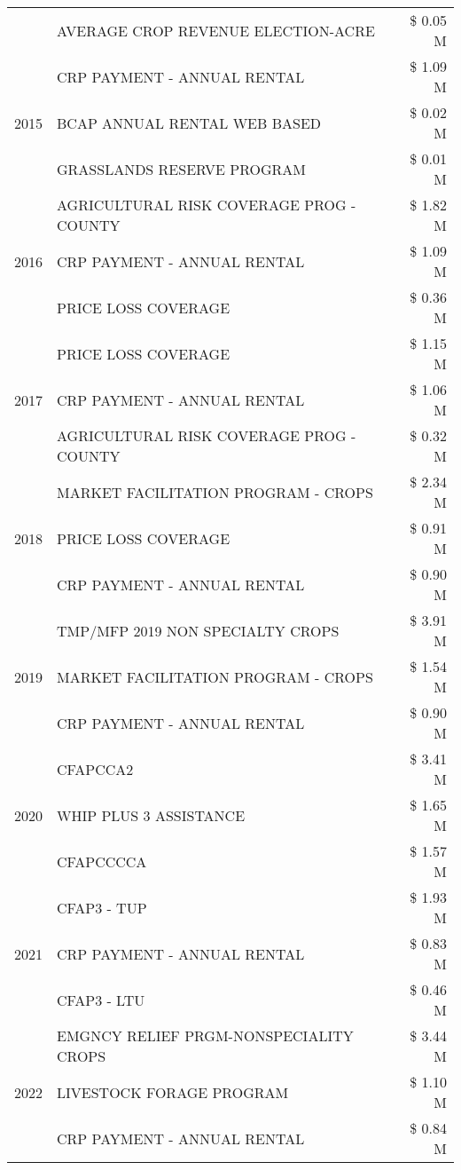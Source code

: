 \begin{tabular}{llr}
 & AVERAGE CROP REVENUE ELECTION-ACRE & \$ 0.05 M \\
\cline{1-3}
\multirow[t]{3}{*}{2015} & CRP PAYMENT - ANNUAL RENTAL & \$ 1.09 M \\
 & BCAP ANNUAL RENTAL WEB BASED & \$ 0.02 M \\
 & GRASSLANDS RESERVE PROGRAM & \$ 0.01 M \\
\cline{1-3}
\multirow[t]{3}{*}{2016} & AGRICULTURAL RISK COVERAGE PROG - COUNTY & \$ 1.82 M \\
 & CRP PAYMENT - ANNUAL RENTAL & \$ 1.09 M \\
 & PRICE LOSS COVERAGE & \$ 0.36 M \\
\cline{1-3}
\multirow[t]{3}{*}{2017} & PRICE LOSS COVERAGE & \$ 1.15 M \\
 & CRP PAYMENT - ANNUAL RENTAL & \$ 1.06 M \\
 & AGRICULTURAL RISK COVERAGE PROG - COUNTY & \$ 0.32 M \\
\cline{1-3}
\multirow[t]{3}{*}{2018} & MARKET FACILITATION PROGRAM - CROPS & \$ 2.34 M \\
 & PRICE LOSS COVERAGE & \$ 0.91 M \\
 & CRP PAYMENT - ANNUAL RENTAL & \$ 0.90 M \\
\cline{1-3}
\multirow[t]{3}{*}{2019} & TMP/MFP 2019 NON SPECIALTY CROPS & \$ 3.91 M \\
 & MARKET FACILITATION PROGRAM - CROPS & \$ 1.54 M \\
 & CRP PAYMENT - ANNUAL RENTAL & \$ 0.90 M \\
\cline{1-3}
\multirow[t]{3}{*}{2020} & CFAPCCA2 & \$ 3.41 M \\
 & WHIP PLUS 3 ASSISTANCE & \$ 1.65 M \\
 & CFAPCCCCA & \$ 1.57 M \\
\cline{1-3}
\multirow[t]{3}{*}{2021} & CFAP3 - TUP & \$ 1.93 M \\
 & CRP PAYMENT - ANNUAL RENTAL & \$ 0.83 M \\
 & CFAP3 - LTU & \$ 0.46 M \\
\cline{1-3}
\multirow[t]{3}{*}{2022} & EMGNCY RELIEF PRGM-NONSPECIALITY CROPS & \$ 3.44 M \\
 & LIVESTOCK FORAGE PROGRAM & \$ 1.10 M \\
 & CRP PAYMENT - ANNUAL RENTAL & \$ 0.84 M \\
\cline{1-3}
\bottomrule
\end{tabular}

